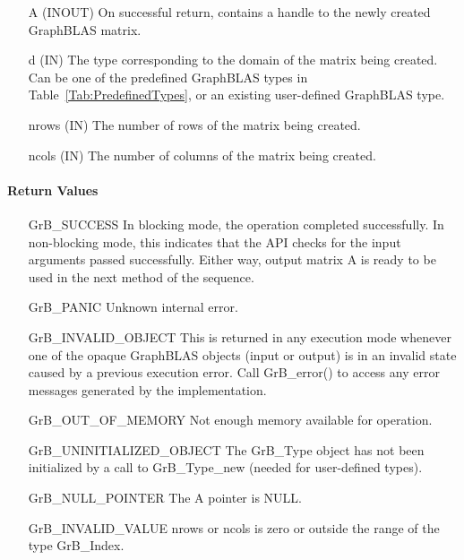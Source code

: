 \begin{itemize}[leftmargin=1.1in]
    \item[{\sf A}] ({\sf INOUT}) On successful return, contains a handle to 
                                 the newly created GraphBLAS matrix.
    \item[{\sf d}] ({\sf IN})    The type corresponding to the domain of the matrix 
                                 being created. Can be one of the predefined
                                 GraphBLAS types in Table~\ref{Tab:PredefinedTypes}, 
                                 or an existing user-defined GraphBLAS type.
    \item[{\sf nrows}] ({\sf IN}) The number of rows of the matrix being created.
    \item[{\sf ncols}] ({\sf IN}) The number of columns of the matrix being created.
\end{itemize}


\paragraph{Return Values}

\begin{itemize}[leftmargin=2.1in]
    \item[{\sf GrB\_SUCCESS}]         In blocking mode, the operation completed
    successfully. In non-blocking mode, this indicates that the API checks 
    for the input arguments passed successfully. Either way, output matrix 
    {\sf A} is ready to be used in the next method of the sequence.

    \item[{\sf GrB\_PANIC}]           Unknown internal error.
    
    \item[{\sf GrB\_INVALID\_OBJECT}] This is returned in any execution mode 
    whenever one of the opaque GraphBLAS objects (input or output) is in an invalid 
    state caused by a previous execution error.  Call {\sf GrB\_error()} to access 
    any error messages generated by the implementation.

    \item[{\sf GrB\_OUT\_OF\_MEMORY}] Not enough memory available for operation.
    
    \item[{\sf GrB\_UNINITIALIZED\_OBJECT}]  The {\sf GrB\_Type} object has not 
    been initialized by a call to {\sf GrB\_Type\_new} (needed for user-defined types).
    
    \item[{\sf GrB\_NULL\_POINTER}]  The {\sf A} pointer is {\sf NULL}.
    
    \item[{\sf GrB\_INVALID\_VALUE}] {\sf nrows} or {\sf ncols} is zero or outside the range of the type {\sf GrB\_Index}.
\end{itemize}

